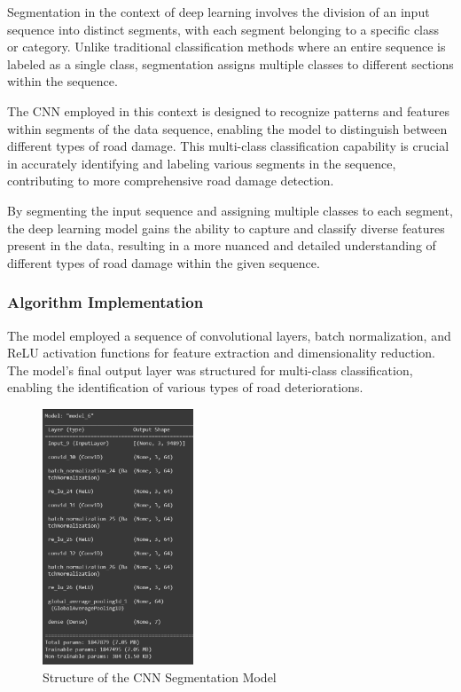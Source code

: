 Segmentation in the context of deep learning involves the division of an input sequence into distinct segments, with each segment belonging to a specific class or category. Unlike traditional classification methods where an entire sequence is labeled as a single class, segmentation assigns multiple classes to different sections within the sequence.

The CNN employed in this context is designed to recognize patterns and features within segments of the data sequence, enabling the model to distinguish between different types of road damage. This multi-class classification capability is crucial in accurately identifying and labeling various segments in the sequence, contributing to more comprehensive road damage detection.

By segmenting the input sequence and assigning multiple classes to each segment, the deep learning model gains the ability to capture and classify diverse features present in the data, resulting in a more nuanced and detailed understanding of different types of road damage within the given sequence.

\subsubsection{Algorithm Implementation}

The model employed a sequence of convolutional layers, batch normalization, and ReLU activation functions for feature extraction and dimensionality reduction. The model's final output layer was structured for multi-class classification, enabling the identification of various types of road deteriorations.

\begin{figure}[H]
  \centering
  \includegraphics[width=0.4\textwidth]{img/SegCNNmodel.png}
  \caption{Structure of the CNN Segmentation Model}
  \label{SegCNNEval}
\end{figure}

